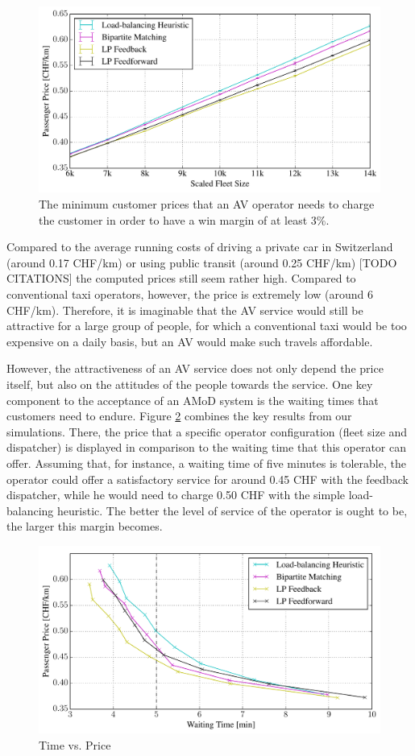 \begin{figure}
\includegraphics[width=1.0\textwidth]{figures/01_passenger_price.pdf}
\caption{The minimum customer prices that an AV operator needs to charge the customer
in order to have a win margin of at least 3\%.}
\label{fig:passenger_price}
\end{figure}

Compared to the average running costs of driving a private car in Switzerland
(around 0.17 CHF/km) or using public transit (around 0.25 CHF/km) [TODO CITATIONS]
the computed prices still seem rather high. Compared to conventional taxi operators,
however, the price is extremely low (around 6 CHF/km). Therefore, it is imaginable
that the AV service would still be attractive for a large group of people, for
which a conventional taxi would be too expensive on a daily basis, but an AV would
make such travels affordable.

However, the attractiveness of an AV service does not only depend the price itself,
but also on the attitudes of the people towards the service. One key component to
the acceptance of an AMoD system is the waiting times that customers need to endure.
Figure \ref{fig:time_vs_price} combines the key results from our simulations. There,
the price that a specific operator configuration (fleet size and dispatcher) is
displayed in comparison to the waiting time that this operator can offer.
Assuming that, for instance, a waiting time of five minutes is tolerable, the
operator could offer a satisfactory service for around 0.45 CHF with the feedback
dispatcher, while he would need to charge 0.50 CHF with the simple load-balancing
heuristic. The better the level of service of the operator is ought to be, the larger
this margin becomes.

\begin{figure}
\includegraphics[width=1.0\textwidth]{figures/time_vs_price.pdf}
\caption{Time vs. Price}
\label{fig:time_vs_price}
\end{figure}
